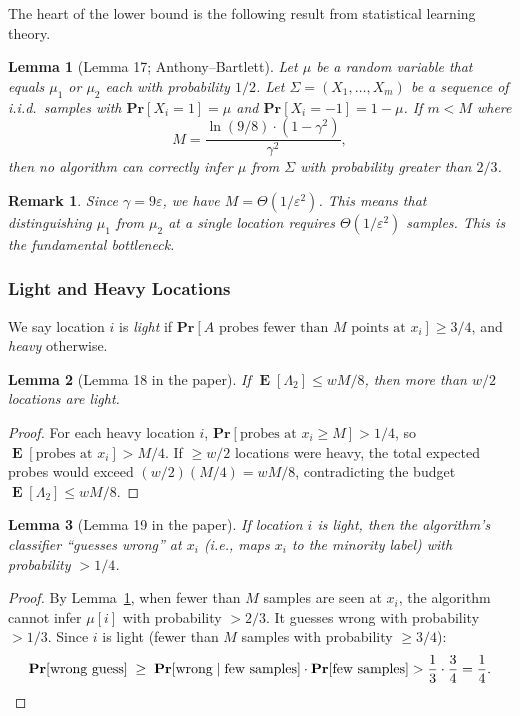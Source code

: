 \documentclass[11pt, a4paper]{article}
\theoremstyle{boxed}
\newtheorem{innerlemma}{Lemma}[section]
\newtheorem{innerremark}{Remark}[section]
\newenvironment{lemma}
  {\begin{mdframed}[style=lemstyle]\begin{innerlemma}}
  {\end{innerlemma}\end{mdframed}}
\newenvironment{remark}
  {\begin{mdframed}[style=notestyle]\begin{innerremark}}
  {\end{innerremark}\end{mdframed}}
\DeclareMathOperator{\E}{\mathbf{E}}
\renewcommand{\Pr}{\mathbf{Pr}}
\begin{document}
The heart of the lower bound is the following result from statistical learning theory.

\begin{lemma}[Lemma 17; Anthony--Bartlett]\label{lem:distinguish}
  Let $\mu$ be a random variable that equals $\mu_1$ or $\mu_2$ each with probability $1/2$. Let $\Sigma = (X_1, \ldots, X_m)$ be a sequence of i.i.d.\ samples with $\Pr[X_i = 1] = \mu$ and $\Pr[X_i = -1] = 1 - \mu$. If $m < M$ where
  \[
    M = \frac{\ln(9/8) \cdot (1 - \gamma^2)}{\gamma^2},
  \]
  then no algorithm can correctly infer $\mu$ from $\Sigma$ with probability greater than $2/3$.
\end{lemma}

\begin{remark}
  Since $\gamma = 9\varepsilon$, we have $M = \Theta(1/\varepsilon^2)$. This means that distinguishing $\mu_1$ from $\mu_2$ at a single location requires $\Theta(1/\varepsilon^2)$ samples. This is the fundamental bottleneck.
\end{remark}

\subsubsection{Light and Heavy Locations}

We say location $i$ is \emph{light} if $\Pr[A \text{ probes fewer than } M \text{ points at } x_i] \ge 3/4$, and \emph{heavy} otherwise.

\begin{lemma}[Lemma 18 in the paper]\label{lem:light}
  If $\E[\Lambda_2] \le wM/8$, then more than $w/2$ locations are light.
\end{lemma}

\begin{proof}
  For each heavy location $i$, $\Pr[\text{probes at } x_i \ge M] > 1/4$, so $\E[\text{probes at } x_i] > M/4$. If $\ge w/2$ locations were heavy, the total expected probes would exceed $(w/2)(M/4) = wM/8$, contradicting the budget $\E[\Lambda_2] \le wM/8$.
\end{proof}

\begin{lemma}[Lemma 19 in the paper]\label{lem:wrong-guess}
  If location $i$ is light, then the algorithm's classifier ``guesses wrong'' at $x_i$ (i.e., maps $x_i$ to the minority label) with probability $> 1/4$.
\end{lemma}

\begin{proof}
  By Lemma~\ref{lem:distinguish}, when fewer than $M$ samples are seen at $x_i$, the algorithm cannot infer $\mu[i]$ with probability $> 2/3$. It guesses wrong with probability $> 1/3$. Since $i$ is light (fewer than $M$ samples with probability $\ge 3/4$):
  \[
    \Pr[\text{wrong guess}] \;\ge\; \Pr[\text{wrong} \mid \text{few samples}] \cdot \Pr[\text{few samples}] > \frac{1}{3} \cdot \frac{3}{4} = \frac{1}{4}. \qedhere
  \]
\end{proof}
\end{document}
